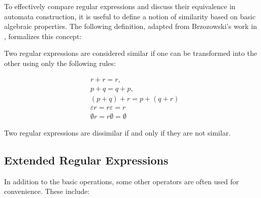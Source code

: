 To effectively compare regular expressions and discuss their equivalence in automata construction, it is useful to define a notion of similarity based on basic algebraic properties. The following definition, adapted from Brzozowski's work in \cite{brzozowski_derivatives}, formalizes this concept:
\begin{defn} 
	Two regular expressions are considered similar if one can be transformed into the other using only the following rules:
	
	\begin{align*}
		& r + r = r, \\
		& p + q = q + p, \\
		& (p + q) + r = p + (q + r) \\
		& \varepsilon r = r \varepsilon = r \\
		& \emptyset r = r \emptyset = \emptyset
	\end{align*}
	
	Two regular expressions are dissimilar if and only if they are not similar.
\end{defn}







	
\subsection{Extended Regular Expressions}
\label{chap:prelim:extended_re}
In addition to the basic operations, some other operators are often used for convenience. These include:

